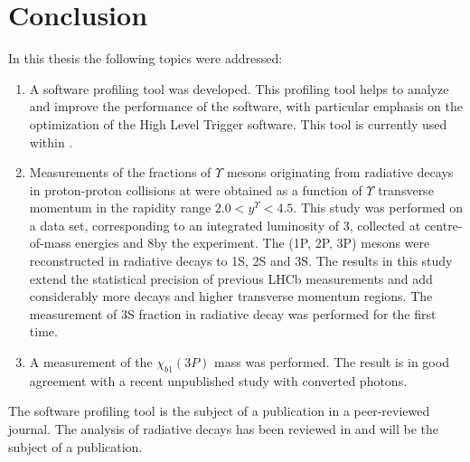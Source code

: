 \chapter{Conclusion}

In this thesis the following topics were addressed: 

\begin{enumerate}

\item A software profiling tool was developed. 
This profiling tool helps to analyze and improve the performance of the  
\lhcb software, with particular emphasis on the optimization of the 
High Level Trigger software. This tool is currently used within \lhcb.

\item  Measurements of the fractions of $\Upsilon$ mesons originating from \chib 
radiative decays in proton-proton collisions at \lhcb were obtained  
as a function of $\Upsilon$ transverse momentum in the rapidity range $2.0 <
y^{\Upsilon} < 4.5$. This study  was performed on a data set, corresponding to 
an integrated luminosity of 3\invfb, collected at  
centre-of-mass energies  and 8\tev by the \lhcb experiment. The \chib (1P, 2P, 3P) 
mesons were reconstructed in radiative decays to \Y1S, \Y2S and \Y3S. 
The results in this study extend the statistical precision of 
previous LHCb measurements and add considerably more decays and higher transverse
momentum regions.  The measurement of \Y3S fraction in radiative \chibThreeP
decay was performed for the first time.

\item A measurement of the $\chi_{b1}(3P)$ mass was  performed. The result is
in good agreement with a recent \lhcb unpublished study with converted photons.

\end{enumerate}

The software profiling tool is the subject of a publication in a peer-reviewed journal. The 
analysis of \chib radiative decays has been reviewed in \lhcb and will be the subject 
of a publication.   

